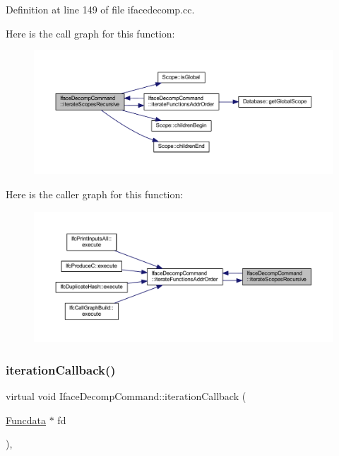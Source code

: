 Definition at line 149 of file ifacedecomp.\+cc.

Here is the call graph for this function\+:
\nopagebreak
\begin{figure}[H]
\begin{center}
\leavevmode
\includegraphics[width=350pt]{class_iface_decomp_command_a9f80fe6092ffac0f38a848eeae0b3773_cgraph}
\end{center}
\end{figure}
Here is the caller graph for this function\+:
\nopagebreak
\begin{figure}[H]
\begin{center}
\leavevmode
\includegraphics[width=350pt]{class_iface_decomp_command_a9f80fe6092ffac0f38a848eeae0b3773_icgraph}
\end{center}
\end{figure}
\mbox{\label{class_iface_decomp_command_a619d9358a4e77bef66a26f02ea7a6c8e}} 
\subsubsection{\texorpdfstring{iterationCallback()}{iterationCallback()}}
{\footnotesize\ttfamily virtual void Iface\+Decomp\+Command\+::iteration\+Callback (\begin{DoxyParamCaption}\item[{\mbox{\hyperlink{class_funcdata}{Funcdata}} $\ast$}]{fd }\end{DoxyParamCaption})\hspace{0.3cm}{\ttfamily [inline]}, {\ttfamily [virtual]}}



